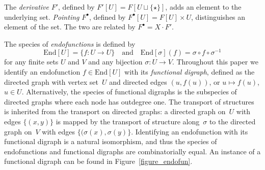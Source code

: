 \documentclass[a4paper,11pt,UKenglish]{article}
\newcommand{\End}{\mathrm{End}}
\theoremstyle{definition}
\begin{document}
The \emph{derivative} $F'$, defined by $F'[U] = F[U \sqcup \{\star\}]$,
adds an element to the underlying set.
\emph{Pointing} $F^{\bullet}$, defined by $F^{\bullet}[U] = F[U]\times U$,
distinguishes an element of the set. The two are related by $F^{\bullet} = X\cdot F'$.

The species of \emph{endofunctions} is defined by
$$
\End[U]=\{f:U\to U\}
\quad\text{and}\quad
\End[\sigma](f)=\sigma\circ f\circ\sigma^{-1}
$$
for any finite sets $U$ and $V$ and any bijection $\sigma:U\to V$.
Throughout this paper we identify an endofunction $f\in\End[U]$
with its \emph{functional digraph}, defined as the directed graph with
vertex set~$U$ and directed edges $(u,f(u))$, or $u\mapsto f(u)$,
$u\in U$.
Alternatively, the species of functional digraphs is the subspecies
of directed graphs where each node has outdegree one.
The transport of structures is inherited from the
transport on directed graphs: a directed graph on~$U$ with edges
$\{(x,y)\}$ is mapped by the transport of structure
along~$\sigma$ to the directed graph on~$V$ with edges
$\{(\sigma(x),\sigma(y)\}$.
Identifying an endofunction with its functional digraph is a natural
isomorphism, and thus the species of endofunctions and functional
digraphs are combinatorially equal. An instance of a functional
digraph can be found in Figure~\ref{figure_endofun}.
\end{document}
